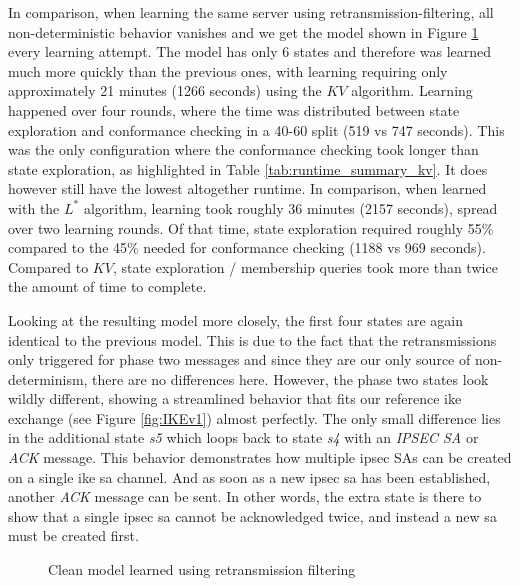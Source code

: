 In comparison, when learning the same server using retransmission-filtering, all non-deterministic behavior vanishes and we get the model shown in Figure \ref{fig:reference} every learning attempt. The model has only 6 states and therefore was learned much more quickly than the previous ones, with learning requiring only approximately 21 minutes (1266 seconds) using the $KV$ algorithm. Learning happened over four rounds, where the time was distributed between state exploration and conformance checking in a 40-60 split (519 vs 747 seconds). This was the only configuration where the conformance checking took longer than state exploration, as highlighted in Table \ref{tab:runtime_summary_kv}. It does however still have the lowest altogether runtime. In comparison, when learned with the $L^*$ algorithm, learning took roughly 36 minutes (2157 seconds), spread over two learning rounds. Of that time, state exploration required roughly 55\% compared to the 45\% needed for conformance checking (1188 vs 969 seconds). Compared to $KV$, state exploration / membership queries took more than twice the amount of time to complete.

Looking at the resulting model more closely, the first four states are again identical to the previous model. This is due to the fact that the retransmissions only triggered for phase two messages and since they are our only source of non-determinism, there are no differences here. However, the phase two states look wildly different, showing a streamlined behavior that fits our reference \ac{ike} exchange (see Figure \ref{fig:IKEv1}) almost perfectly. The only small difference lies in the additional state \emph{s5} which loops back to state \emph{s4} with an \emph{IPSEC SA} or \emph{ACK} message. This behavior demonstrates how multiple \ac{ipsec} SAs can be created on a single \ac{ike} \ac{sa} channel. And as soon as a new \ac{ipsec} \ac{sa} has been established, another \emph{ACK} message can be sent. In other words, the extra state is there to show that a single \ac{ipsec} \ac{sa} cannot be acknowledged twice, and instead a new \ac{sa} must be created first.

\begin{figure}[ht]
	\vspace*{\fill}
	\noindent
	\hspace*{-2.1\oddsidemargin}%
	\caption{Clean model learned using retransmission filtering}
	\label{fig:reference}
	\vspace*{\fill}
\end{figure}

